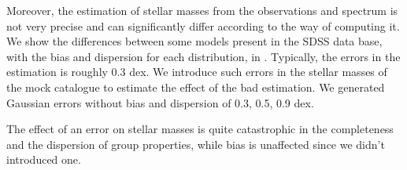 Moreover, the estimation of stellar masses from the observations and spectrum
is not very precise and can significantly differ according to the way of
computing it. We show the differences between some models present in the SDSS
data base, with the bias and dispersion for each distribution, in
. Typically, the errors in the estimation is
roughly 0.3 dex. We introduce such errors in the stellar masses of the mock
catalogue to estimate the effect of the bad estimation. We generated Gaussian
errors without bias and dispersion of 0.3, 0.5, 0.9 dex.
%
\begin{figure}[htbp]
    \centering
    \begin{minipage}{\linewidth}
        \centering
        \begin{minipage}{0.49\linewidth}
        \end{minipage}
        \begin{minipage}{0.49\linewidth}
        \end{minipage}
    \end{minipage}
    \begin{minipage}{\linewidth}
        \centering
        \begin{minipage}{0.49\linewidth}
        \end{minipage}
        \begin{minipage}{0.49\linewidth}
        \end{minipage}
        \begin{minipage}{0.49\linewidth}
        \end{minipage}
    \end{minipage}
\end{figure}
%
The effect of an error on stellar masses is quite catastrophic in the
completeness and the dispersion of group properties, while bias is
unaffected since we didn't introduced one.

